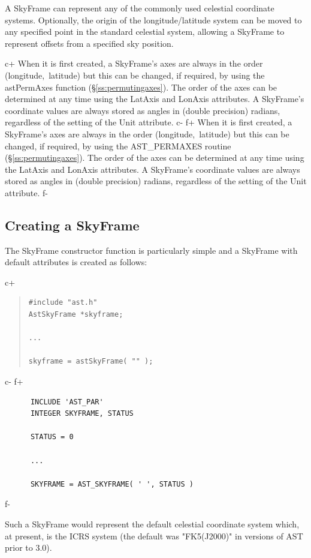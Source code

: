 \documentclass[twoside,11pt]{article}
\newcommand{\secref}[1]{\S\ref{#1}}
\newcommand{\secref}[1]{\ref{#1}}
\begin{document}
A SkyFrame can represent any of the commonly used celestial coordinate
systems. Optionally, the origin of the longitude/latitude system can be 
moved to any specified point in the standard celestial system, allowing
a SkyFrame to represent offsets from a specified sky position.

c+
When it is first created, a SkyFrame's axes are always in the order
(longitude,~latitude) but this can be changed, if required, by using the
astPermAxes function (\secref{ss:permutingaxes}). The order of the axes
can be determined at any time using the LatAxis and LonAxis attributes. A
SkyFrame's coordinate values are always stored as angles in (double
precision) radians, regardless of the setting of the Unit attribute.
c-
f+
When it is first created, a SkyFrame's axes are always in the order
(longitude,~latitude) but this can be changed, if required, by using the
AST\_PERMAXES routine (\secref{ss:permutingaxes}). The order of the axes
can be determined at any time using the LatAxis and LonAxis attributes. A
SkyFrame's coordinate values are always stored as angles in (double
precision) radians, regardless of the setting of the Unit attribute.
f-

\subsection{Creating a SkyFrame}

The SkyFrame constructor function is particularly simple and a
SkyFrame with default attributes is created as follows:

c+
\begin{quote}
\small
\begin{verbatim}
#include "ast.h"
AstSkyFrame *skyframe;

...

skyframe = astSkyFrame( "" );
\end{verbatim}
\normalsize
\end{quote}
c-
f+
\small
\begin{verbatim}
      INCLUDE 'AST_PAR'
      INTEGER SKYFRAME, STATUS

      STATUS = 0

      ...

      SKYFRAME = AST_SKYFRAME( ' ', STATUS )
\end{verbatim}
\normalsize
f-

Such a SkyFrame would represent the default celestial coordinate
system which, at present, is the ICRS system (the default was "FK5(J2000)" 
in versions of AST prior to 3.0).
\end{document}
